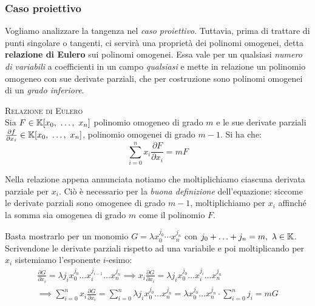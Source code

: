 \subsubsection{Caso proiettivo}
Vogliamo analizzare la tangenza nel \textit{caso proiettivo}. Tuttavia, prima di trattare di punti singolare o tangenti, ci servirà una proprietà dei polinomi omogenei, detta \textbf{relazione di Eulero} sui polinomi omogenei. Essa vale per un qualsiasi \textit{numero di variabili} a coefficienti in un campo \textit{qualsiasi} e mette in relazione un polinomio omogeneo con sue derivate parziali, che per costruzione sono polinomi omogenei di un \textit{grado inferiore}.
\begin{theorema}\textsc{Relazione di Eulero}  \\
	Sia $F\in\mathbb{K}[x_0,\ \ldots,\ x_n]$ polinomio omogeneo di grado $m$ e le sue derivate parziali $\frac{\partial{f}}{\partial{x_i}}\in\kamp[x_0,\ \ldots,\ x_n]$, polinomio omogenei di grado $m-1$. Si ha che:
		\begin{equation}
			\sum_{i=0}^n x_i\frac{\partial{F}}{\partial{x_i}}=mF
		\end{equation}
	\vspace{-6mm}
\end{theorema}
Nella relazione appena annunciata notiamo che moltiplichiamo ciascuna derivata parziale per $x_i$. Ciò è necessario per la \textit{buona definizione} dell'equazione: siccome le derivate parziali sono omogenee di grado $m-1$, moltiplichiamo per $x_i$ affinché la somma sia omogenea di grado $m$ come il polinomio $F$.
\begin{demonstration}
	Basta mostrarlo per un monomio $G=\lambda x_0^{j_0}\cdots x_n^{j_n}$ con $j_0+\ldots+j_n=m,\ \lambda\in\kamp$. Scrivendone le derivate parziali rispetto ad una variabile e poi moltiplicando per $x_i$ sistemiamo l'esponente $i$-esimo:
		\begin{gather*}
			\frac{\partial{G}}{\partial{x_i}}=\lambda j_i x_0^{j_0}\ldots x_i^{j_{i-1}} \ldots x_n^{j_n} \implies  x_i \frac{\partial{G}}{\partial{x_i}}=\lambda j_i x_0^{j_0}\ldots x_i^{j_i} \ldots x_n^{j_n}\\
			\implies \sum_{i=0}^n x_i\frac{\partial{G}}{\partial{x_i}} = \sum_{i=0}^n \lambda j_i x_0^{j_0} \ldots x_n^{j_n}=\lambda x_0^{j_0}\ldots x_n^{j_n} \cdot \sum_{i=0}^n j_i =mG
		\end{gather*}
\end{demonstration}
